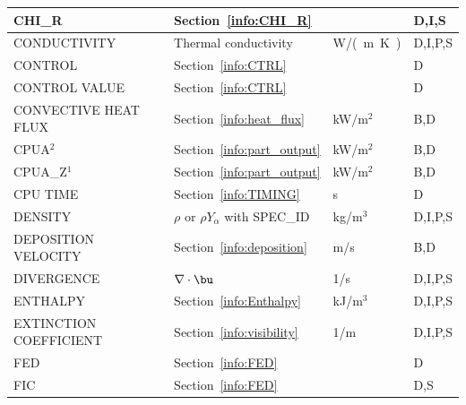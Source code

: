 \documentclass[11pt]{book}
\begin{document}
\begin{longtable}{@{\extracolsep{\fill}}|l|l|l|l|}
{\ct CHI\_R}                                    & Section~\ref{info:CHI_R}             &                & D,I,S        \\ \hline
{\ct CONDUCTIVITY}                              & Thermal conductivity                          & \si{W/(m.K)}   & D,I,P,S      \\ \hline
{\ct CONTROL}                                   & Section~\ref{info:CTRL}                       &                & D            \\ \hline
{\ct CONTROL VALUE}                             & Section~\ref{info:CTRL}                       &                & D            \\ \hline
{\ct CONVECTIVE HEAT FLUX}                      & Section~\ref{info:heat_flux}                  & kW/m$^2$       & B,D          \\ \hline
{\ct CPUA}$^2$                                  & Section~\ref{info:part_output}                & kW/m$^2$       & B,D          \\ \hline
{\ct CPUA\_Z}$^1$                               & Section~\ref{info:part_output}                & kW/m$^2$       & B,D          \\ \hline
{\ct CPU TIME}                                  & Section~\ref{info:TIMING}                     & s              & D            \\ \hline
{\ct DENSITY}                                   & $\rho$ or $\rho Y_\alpha$ with {\ct SPEC\_ID} & kg/m$^3$       & D,I,P,S      \\ \hline
{\ct DEPOSITION VELOCITY}                       & Section~\ref{info:deposition}                 & m/s            & B,D          \\ \hline
{\ct DIVERGENCE}                                & $\nabla \cdot \bu$                            & 1/s            & D,I,P,S      \\ \hline
{\ct ENTHALPY}                                  & Section~\ref{info:Enthalpy}                   & kJ/m$^3$       & D,I,P,S      \\ \hline
{\ct EXTINCTION COEFFICIENT}                    & Section~\ref{info:visibility}                 & 1/m            & D,I,P,S      \\ \hline
{\ct FED}                                       & Section~\ref{info:FED}                        &                & D            \\ \hline
{\ct FIC}                                       & Section~\ref{info:FED}                        &                & D,S          \\ \hline

\end{longtable}
\end{document}
